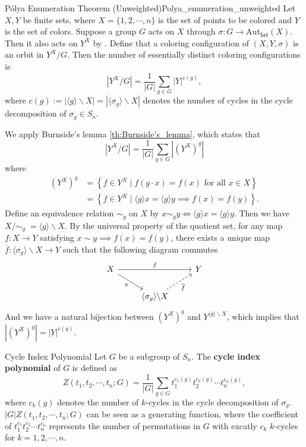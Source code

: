\begin{theorem}{Pólya Enumeration Theorem (Unweighted)}{Polya_enumeration_unweighted}
    Let $X, Y$ be finite sets, where $X=\{1,2,\cdots,n\}$ is the set of points to be colored and $Y$ is the set of colors. Suppose a group $G$ acts on $X$ through $\sigma:G\to\mathrm{Aut}_{\mathsf{Set}}(X)$. Then it also acts on $Y^X$ by . Define that a coloring configuration of $(X,Y,\sigma)$ is an orbit in $Y^X/G$. Then the number of essentially distinct coloring configurations is
    $$
        \left|Y^X / G\right|=\frac{1}{|G|} \sum_{g \in G}|Y|^{c(g)},
    $$
    where $c(g):=\left|\langle g\rangle \backslash X\right|=\left|\langle \sigma_g\rangle \backslash X\right|$ denotes the number of cycles in the cycle decomposition of $\sigma_g \in S_n$.
\end{theorem}

\begin{prf}
    We apply Burnside's lemma \ref{th:Burnside's_lemma}, which states that
    $$
        \left|Y^X / G\right|=\frac{1}{|G|} \sum_{g \in G}\left|\left(Y^X\right)^g\right|
    $$
    where
    \begin{align*}
        \left(Y^X\right)^g & =\left\{ f \in Y^X \mid f(g \cdot x)=f (x)\text{ for all }x \in X\right\}                  \\
                           & =\left\{ f \in Y^X \mid \langle g\rangle x = \langle g\rangle y\implies f(x)=f(y)\right\}.
    \end{align*}
    Define an equivalence relation $\sim_g$ on $X$ by $x \sim_g y\iff\langle g\rangle x = \langle g\rangle y$. Then we have $X/\sim_g\;=\langle g\rangle \backslash X$. By the universal property of the quotient set, for any map $f:X\to Y$ satisfying $x\sim y\implies f(x)=f(y)$, there exists a unique map $\overline{f}:\langle \sigma_g\rangle \backslash X\to Y$ such that the following diagram commutes
    \[
        \begin{tikzcd}[ampersand replacement=\&]
            X \arrow[rr, "f"] \arrow[rd,"\pi"'] \&  \& Y \\
            \& \langle \sigma_g\rangle \backslash X \arrow[ru, "\overline{f}"',dashed] \&
        \end{tikzcd}
    \]
    And we have a natural bijection between $\left(Y^X\right)^g$ and $Y^{\langle g\rangle \backslash X}$, which implies that $\left|\left(Y^X\right)^g\right|=|Y|^{c(g)}$.
\end{prf}

\begin{definition}{Cycle Index Polynomial}{}
    Let $G$ be a subgroup of $S_n$. The \textbf{cycle index polynomial} of $G$ is defined as
    $$
        Z(t_1,t_2,\cdots,t_n;G)=\frac{1}{|G|}\sum_{g\in G}t_1^{c_1(g)}t_2^{c_2(g)}\cdots t_n^{c_n(g)},
    $$
    where $c_k(g)$ denotes the number of $k$-cycles in the cycle decomposition of $\sigma_g$. $|G|Z(t_1,t_2,\cdots,t_n;G)$ can be seen as a generating function, where the coefficient of $t_1^{c_1}t_2^{c_2}\cdots t_n^{c_n}$ represents the number of permutations in $G$ with excatly $c_k$ $k$-cycles for $k=1,2,\cdots,n$.
\end{definition}

